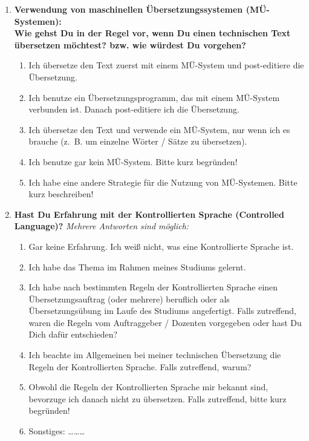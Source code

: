 \begin{enumerate}
\item \textbf{Verwendung von maschinellen Übersetzungssystemen (MÜ-Systemen):}\\
\textbf{Wie gehst Du in der Regel vor, wenn Du einen technischen Text übersetzen möchtest? bzw. wie würdest Du vorgehen?}


\begin{enumerate}
\item Ich übersetze den Text zuerst mit einem MÜ-System und post-editiere die Übersetzung.
\item Ich benutze ein Übersetzungsprogramm, das mit einem MÜ-System verbunden ist. Danach post-editiere ich die Übersetzung.
\item Ich übersetze den Text und verwende ein MÜ-System, nur wenn ich es brauche (z.~B. um einzelne Wörter / Sätze zu übersetzen).
\item Ich benutze gar kein MÜ-System. Bitte kurz begründen!
\item Ich habe eine andere Strategie für die Nutzung von MÜ-Systemen. Bitte kurz beschreiben!
\end{enumerate}


\item \textbf{Hast Du Erfahrung mit der Kontrollierten Sprache (Controlled Language)?} \textit{Mehrere Antworten sind möglich:}

\begin{enumerate}
\item Gar keine Erfahrung. Ich weiß nicht, was eine Kontrollierte Sprache ist.
\item Ich habe das Thema im Rahmen meines Studiums gelernt.
\item Ich habe nach bestimmten Regeln der Kontrollierten Sprache einen Übersetzungsauftrag (oder mehrere) beruflich oder als Übersetzungsübung im Laufe des Studiums angefertigt. Falls zutreffend, waren die Regeln vom Auftraggeber / Dozenten vorgegeben oder hast Du Dich dafür entschieden?
\item Ich beachte im Allgemeinen bei meiner technischen Übersetzung die Regeln der Kontrollierten Sprache. Falls zutreffend, warum?
\item Obwohl die Regeln der Kontrollierten Sprache mir bekannt sind, bevorzuge ich danach nicht zu übersetzen. Falls zutreffend, bitte kurz begründen!
\item Sonstiges: ………
\end{enumerate}

\end{enumerate}


